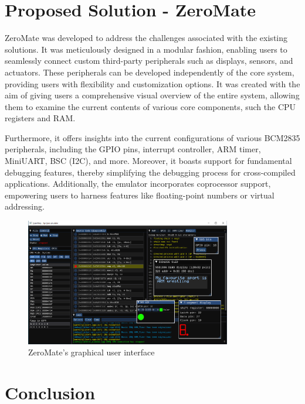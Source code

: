 \documentclass{template_svk}
\begin{document}
\section{Proposed Solution - ZeroMate}

ZeroMate was developed to address the challenges associated with the existing solutions. It was meticulously designed in a modular fashion, enabling users to seamlessly connect custom third-party peripherals such as displays, sensors, and actuators. These peripherals can be developed independently of the core system, providing users with flexibility and customization options. It was created with the aim of giving users a comprehensive visual overview of the entire system, allowing them to examine the current contents of various core components, such the CPU registers and RAM.

\newpage

Furthermore, it offers insights into the current configurations of various BCM2835 peripherals, including the GPIO pins, interrupt controller, ARM timer, MiniUART, BSC (I2C), and more. Moreover, it boasts support for fundamental debugging features, thereby simplifying the debugging process for cross-compiled applications. Additionally, the emulator incorporates coprocessor support, empowering users to harness features like floating-point numbers or virtual addressing.

\begin{figure}[!ht]
	\centering
	\includegraphics[width=0.8\textwidth]{img/screenshot.pdf}
	\caption{ZeroMate’s graphical user interface}
\end{figure}

\section{Conclusion}
\end{document}
